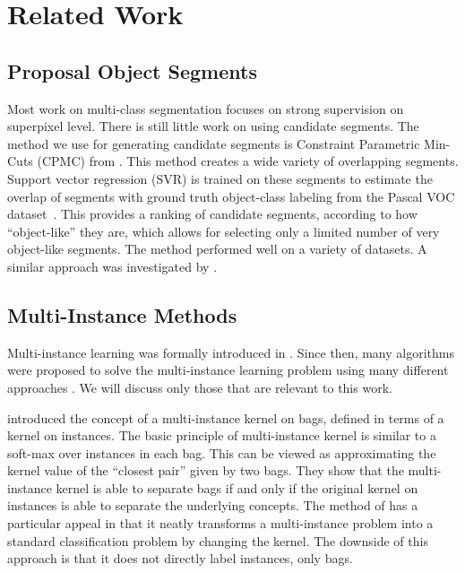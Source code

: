 \section{Related Work}
\subsection{Proposal Object Segments}\label{related_segments}
Most work on multi-class segmentation focuses on strong supervision on superpixel level. There is still little work on using candidate segments.
The method we use for generating candidate segments is Constraint Parametric Min-Cuts (CPMC) from \citet{carreira2010constrained}.
This method creates a wide variety of overlapping segments. Support vector regression (SVR) is trained on these segments
to estimate the overlap of segments with ground truth object-class labeling
from the Pascal VOC dataset~\citep{pascal}. This provides a ranking of candidate segments, according to how ``object-like'' they are, which
allows for selecting only a limited number of very object-like segments.
The method performed well on a variety of datasets.
A similar approach was investigated by \citet{endres2010category}.

\subsection{Multi-Instance Methods}
Multi-instance learning was formally introduced in \citet{dietterich1997solving}.
Since then, many algorithms were proposed to solve the multi-instance learning problem
using many different approaches \citep{andrews2003support,gaertner2002multi,zhou2009multi,li2009convex,zhang2002dd,mangasarian2008multiple,leistner2010miforests,chen2006miles}.
We will discuss only those that are relevant to this work.

\citet{gaertner2002multi} introduced the concept of a multi-instance
kernel on bags, defined in terms of a kernel on instances. 
The basic principle of multi-instance kernel is similar to a soft-max over instances in
each bag. This can be viewed as approximating the kernel value of the ``closest pair'' given by two bags. They show that the multi-instance kernel
is able to separate bags if and only if the original kernel on instances is able to separate the underlying concepts.
The method of \citet{gaertner2002multi} has a particular appeal in that it neatly transforms a multi-instance problem into a standard
classification problem by changing the kernel. The downside of this approach is that it does
not directly label instances, only bags.

